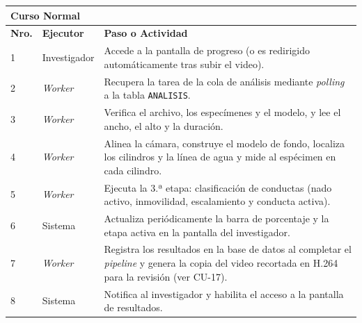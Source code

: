 \noindent
\begin{tabular}{|p{1.0cm}|p{3.7cm}|p{9.5cm}|}
\hline
\multicolumn{3}{|l|}{\textbf{Curso Normal}} \\
\hline
\textbf{Nro.} & \textbf{Ejecutor} & \textbf{Paso o Actividad} \\
\hline
1 & Investigador & Accede a la pantalla de progreso (o es redirigido automáticamente tras subir el video). \\
\hline
2 & \textit{Worker} & Recupera la tarea de la cola de análisis mediante \textit{polling} a la tabla \texttt{ANALISIS}. \\
\hline
3 & \textit{Worker} & Verifica el archivo, los especímenes y el modelo, y lee el ancho, el alto y la duración. \\
\hline
4 & \textit{Worker} & Alinea la cámara, construye el modelo de fondo, localiza los cilindros y la línea de agua y mide al espécimen en cada cilindro. \\
\hline
5 & \textit{Worker} & Ejecuta la 3.ª etapa: clasificación de conductas (nado activo, inmovilidad, escalamiento y conducta activa). \\
\hline
6 & Sistema & Actualiza periódicamente la barra de porcentaje y la etapa activa en la pantalla del investigador. \\
\hline
7 & \textit{Worker} & Registra los resultados en la base de datos al completar el \textit{pipeline} y genera la copia del video recortada en H.264 para la revisión (ver CU-17). \\
\hline
8 & Sistema & Notifica al investigador y habilita el acceso a la pantalla de resultados. \\
\hline
\end{tabular}

